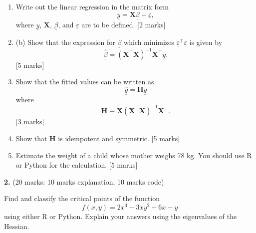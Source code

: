 \documentclass{article}
\begin{document}
\begin{enumerate}[label=(\alph*)]
    \item Write out the linear regression in the matrix form
    \[
    \underline{y} = \bm{X}\underline{\beta} + \underline{\varepsilon},
    \]
    where $\underline{y}$, $\bm{X}$, $\underline{\beta}$, and $\underline{\varepsilon}$ are to be defined. [2 marks]

    \item (b) Show that the expression for $\underline{\beta}$ which minimizes $\underline{\varepsilon}^{\top}\underline{\varepsilon}$ is given by
    \[
    \hat{\underline{\beta}} = (\bm{X}^{\top}\bm{X})^{-1} \bm{X}^{\top} \underline{y}.
    \]
    [5 marks]

    \item Show that the fitted values can be written as
    \[
    \hat{\underline{y}} = \bm{H} \underline{y}
    \]
    where
    \[
    \bm{H} \equiv \bm{X} (\bm{X}^{\top} \bm{X})^{-1} \bm{X}^{\top}.
    \]
    [3 marks]

    \item Show that $\bm{H}$ is idempotent and symmetric. [5 marks]

    \item Estimate the weight of a child whose mother weighs 78 kg. You should use R or Python for the calculation. [5 marks]
\end{enumerate}

\bigskip


\textbf{2.} (20 marks: 10 marks explanation, 10 marks code)

Find and classify the critical points of the function
\[
f(x,y) = 2x^3 - 3xy^2 + 6x - y
\]
using either R or Python. Explain your answers using the eigenvalues of the Hessian.
\end{document}
